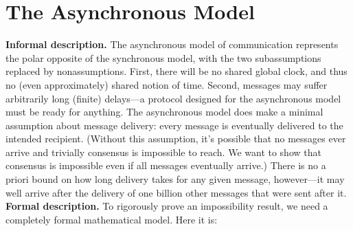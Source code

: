 \section{The Asynchronous Model}
\noindent
\textbf{Informal description.} The asynchronous model of communication represents the polar opposite of the synchronous model, with the two subassumptions replaced by nonassumptions. First, there will be no shared global clock, and thus no (even approximately)
shared notion of time. Second, messages may suffer arbitrarily long (finite) delays—a protocol designed for the asynchronous model must be ready for anything.
The asynchronous model does make a minimal assumption about message delivery: every
message is eventually delivered to the intended recipient. (Without this assumption, it’s
possible that no messages ever arrive and trivially consensus is impossible to reach. We
want to show that consensus is impossible even if all messages eventually arrive.) There is
no a priori bound on how long delivery takes for any given message, however—it may well
arrive after the delivery of one billion other messages that were sent after it.\\

\noindent
\textbf{Formal description.} To rigorously prove an impossibility result, we need a completely
formal mathematical model. Here it is:

